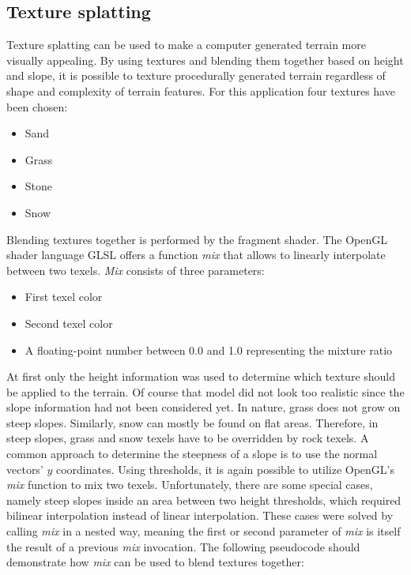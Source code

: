\documentclass[11pt,a4paper,twoside,openright]{report}
\begin{document}
\subsection{Texture splatting}
Texture splatting can be used to make a computer generated terrain more visually appealing. By using textures and blending them together based on height and slope, it is possible to texture procedurally generated terrain regardless of shape and complexity of terrain features. For this application four textures have been chosen:
\begin{itemize}
\item Sand
\item Grass
\item Stone
\item Snow
\end{itemize}
Blending textures together is performed by the fragment shader. The OpenGL shader language GLSL offers a function \emph{mix} that allows to linearly interpolate between two texels. \emph{Mix} consists of three parameters:
\begin{itemize}
\item First texel color
\item Second texel color
\item A floating-point number between 0.0 and 1.0 representing the mixture ratio
\end{itemize}
At first only the height information was used to determine which texture should be applied to the terrain. Of course that model did not look too realistic since the slope information had not been considered yet. In nature, grass does not grow on steep slopes. Similarly, snow can mostly be found on flat areas. Therefore, in steep slopes, grass and snow texels have to be overridden by rock texels. A common approach to determine the steepness of a slope is to use the normal vectors' $y$ coordinates. Using thresholds, it is again possible to utilize OpenGL's \emph{mix} function to mix two texels. Unfortunately, there are some special cases, namely steep slopes inside an area between two height thresholds, which required bilinear interpolation instead of linear interpolation. These cases were solved by calling \emph{mix} in a nested way, meaning the first or second parameter of \emph{mix} is itself the result of a previous \emph{mix} invocation. The following pseudocode should demonstrate how \emph{mix} can be used to blend textures together:
\end{document}
